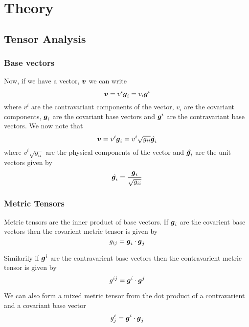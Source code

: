 \clearemptydoublepage
\chapter{Theory}
\label{cha:theory}

\section{Tensor Analysis}

\subsection{Base vectors}

Now, if we have a vector, $\vect{v}$ we can write
\begin{equation}
\vect{v}=v^{i}\vect{g}_{i}=v_{i}\vect{g}^{i}
\end{equation}
where $v^{i}$ are the contravariant components of the vector, $v_{i}$ are
the covariant components, $\vect{g}_{i}$ are the covariant base vectors and
$\vect{g}^{i}$ are the contravariant base vectors. We now note that
\begin{equation}
  \vect{v}=v^{i}\vect{g}_{i}=v^{i}\sqrt{g_{ii}}\hat{\vect{g}_{i}}
\end{equation}
where $v^{i}\sqrt{g_{ii}}$ are the physical components of the vector and
$\hat{\vect{g}_{i}}$ are the unit vectors given by
\begin{equation}
  \hat{\vect{g}_{i}}=\dfrac{\vect{g}_{i}}{\sqrt{g_{ii}}}
\end{equation}

\subsection{Metric Tensors}

Metric tensors are the inner product of base vectors. If $\vect{g}_{i}$ are the
covarient base vectors then the covarient metric tensor is given by
\begin{equation}
  g_{ij}=\dotprod{\vect{g}_{i}}{\vect{g}_{j}}
\end{equation}

Similarily if $\vect{g}^{i}$ are the contravarient base vectors then the
contravarient metric tensor is given by 
\begin{equation}
  g^{ij}=\dotprod{\vect{g}^{i}}{\vect{g}^{j}}
\end{equation}

We can also form a mixed metric tensor from the dot product of a contravarient
and a covariant base vector \ie
\begin{equation}
  g^{i}_{j}=\dotprod{\vect{g}^{i}}{\vect{g}_{j}}
\end{equation}

